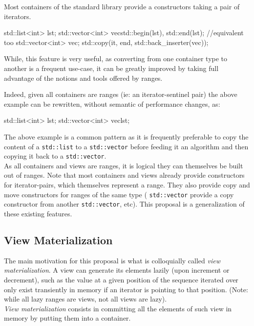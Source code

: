 \documentclass{wg21}
\newcommand{\cc}[1]{\texttt{#1}}
\begin{document}
Most containers of the standard library provide a constructors taking a pair of iterators.

\begin{codeblock}
    std::list<int> lst;
    std::vector<int> vec{std::begin(lst), std::end(lst)};
    //equivalent too
    std::vector<int> vec;
    std::copy(it, end, std::back_inserter(vec));
\end{codeblock}

While, this feature is very useful, as converting from one container type to another is a frequent
use-case, it can be greatly improved by taking full advantage of the notions and tools offered by ranges.

Indeed, given all containers are ranges (ie: an iterator-sentinel pair) the above example can be rewritten, without semantic of performance changes, as:

\begin{codeblock}
    std::list<int> lst;
    std::vector<int> vec{lst};
\end{codeblock}


The above example is a common pattern as it is frequently preferable to copy the content of a \cc{std::list} to
a \cc{std::vector} before feeding it an algorithm and then copying it back to a \cc{std::vector}.\\

As all containers and views are ranges, it is logical they can themselves be built out of ranges.
Note that most containers and views already provide constructors for iterator-pairs, which themselves represent a range.
They also provide copy and move constructors for ranges of the same type ( \cc{std::vector} provide a copy constructor from another \cc{std::vector}, etc).
This proposal is a generalization of these existing features.

\subsection{View Materialization}

The main motivation for this proposal is what is colloquially called \emph{view materialization}.
A view can generate its elements lazily (upon increment or decrement), such as the value at a given position of the sequence
iterated over only exist transiently in memory if an iterator is pointing to that position.
(Note: while all lazy ranges are views, not all views are lazy).\\

\emph{View materialization} consists in committing all the elements of such view in memory by putting them into a container.
\end{document}
